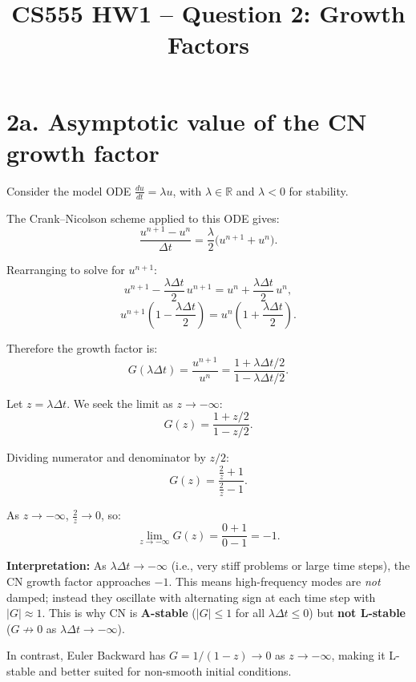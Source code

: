 \documentclass[11pt]{article}
\title{CS555 HW1 -- Question 2: Growth Factors}
\author{}
\date{}
\begin{document}
\maketitle

\section*{2a. Asymptotic value of the CN growth factor}

Consider the model ODE $\frac{du}{dt} = \lambda u$, with $\lambda \in \mathbb{R}$
and $\lambda < 0$ for stability.

The Crank--Nicolson scheme applied to this ODE gives:
\[
  \frac{u^{n+1} - u^{n}}{\Delta t}
  = \frac{\lambda}{2}\bigl(u^{n+1} + u^{n}\bigr).
\]

Rearranging to solve for $u^{n+1}$:
\[
  u^{n+1} - \frac{\lambda\Delta t}{2}\,u^{n+1}
  = u^{n} + \frac{\lambda\Delta t}{2}\,u^{n},
\]
\[
  u^{n+1}\!\left(1 - \frac{\lambda\Delta t}{2}\right)
  = u^{n}\!\left(1 + \frac{\lambda\Delta t}{2}\right).
\]

Therefore the growth factor is:
\[
  \boxed{G(\lambda\Delta t)
  = \frac{u^{n+1}}{u^{n}}
  = \frac{1 + \lambda\Delta t/2}{1 - \lambda\Delta t/2}.}
\]

Let $z = \lambda\Delta t$. We seek the limit as $z \to -\infty$:
\[
  G(z) = \frac{1 + z/2}{1 - z/2}.
\]

Dividing numerator and denominator by $z/2$:
\[
  G(z) = \frac{\frac{2}{z} + 1}{\frac{2}{z} - 1}.
\]

As $z \to -\infty$, $\frac{2}{z} \to 0$, so:
\[
  \boxed{\lim_{z \to -\infty} G(z)
  = \frac{0 + 1}{0 - 1} = -1.}
\]

\medskip\noindent\textbf{Interpretation:}
As $\lambda\Delta t \to -\infty$ (i.e., very stiff problems or large time steps),
the CN growth factor approaches $-1$.
This means high-frequency modes are \emph{not} damped; instead they oscillate
with alternating sign at each time step with $|G| \approx 1$.
This is why CN is \textbf{A-stable} ($|G| \le 1$ for all $\lambda\Delta t \le 0$)
but \textbf{not L-stable} ($G \not\to 0$ as $\lambda\Delta t \to -\infty$).

In contrast, Euler Backward has $G = 1/(1-z) \to 0$ as $z \to -\infty$,
making it L-stable and better suited for non-smooth initial conditions.

\newpage
\end{document}
